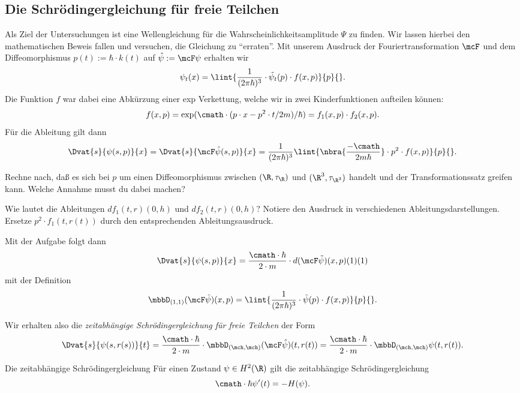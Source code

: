 \documentclass{subfiles}
\begin{document}
    \subsection{Die Schrödingergleichung für freie Teilchen}
    Als Ziel der Untersuchungen ist eine Wellengleichung für die Wahrscheinlichkeitsamplitude $\Psi$ zu finden. Wir lassen hierbei den mathematischen Beweis fallen und versuchen, die Gleichung zu \enquote{erraten}. Mit unserem Ausdruck der Fouriertransformation $\mcF$ und dem Diffeomorphismus $p(t) := \hbar\cdot k(t)$ auf $\hat\psi:=\mcF\psi$ erhalten wir
    \[
        \psi_t(x) = \lint{\frac{1}{(2\pi\hbar)^3}\cdot\tilde\psi_t(p)\cdot f(x,p)}{p}{}.
    \]
    Die Funktion $f$ war dabei eine Abkürzung einer exp Verkettung, welche wir in zwei Kinderfunktionen aufteilen können:
    \[f(x,p) = \exp(\cmath\cdot(p\cdot x - p^2\cdot t/2m)/\hbar) = f_1(x,p)\cdot f_2(x,p).\]
    Für die Ableitung gilt dann
    \[
        \Dvat{s}{\psi(s,p)}{x} = \Dvat{s}{\mcF\hat\psi(s,p)}{x} = \frac{1}{(2\pi\hbar)^3}\lint{\nbra{\frac{-\cmath}{2m\hbar}}\cdot p^2\cdot f(x,p)}{p}{}.
    \]
    \begin{Aufgabe}
        \nr{} Rechne nach, daß es sich bei $p$ um einen Diffeomorphismus zwischen $(\R,\tau_\R)$ und $(\R^3,\tau_{\R^3})$ handelt und der Transformationssatz greifen kann. Welche Annahme musst du dabei machen?

        \nr{} Wie lautet die Ableitungen $df_1(t,r)(0,h)$ und $df_2(t,r)(0,h)$? Notiere den Ausdruck in verschiedenen Ableitungsdarstellungen. Ersetze $p^2\cdot f_1(t,r(t))$ durch den entsprechenden Ableitungsausdruck. 
    \end{Aufgabe}
    \noindent Mit der Aufgabe folgt dann 
    \[\Dvat{s}{\psi(s,p)}{x} = \frac{\cmath\cdot\hbar}{2\cdot m}\cdot d(\mcF\tilde\psi)(x,p)(1)(1)\]
    mit der Definition 
    \[\mbbD_{(1,1)}(\mcF\hat\psi)(x,p) = \lint{\frac{1}{(2\pi\hbar)^3}\cdot\hat\psi(p)\cdot f(x,p)}{p}{}.\]
    \begin{whiteframedr}
        Wir erhalten also die \emph{zeitabhängige Schrödingergleichung für freie Teilchen} der Form
        \[\Dvat{s}{\psi(s,r(s))}{t} = \frac{\cmath\cdot\hbar}{2\cdot m}\cdot\mbbD_{(\mch,\mch)}(\mcF\hat\psi)(t,r(t)) = \frac{\cmath\cdot\hbar}{2\cdot m}\cdot\mbbD_{(\mch,\mch)}\psi(t,r(t)).\]
    \end{whiteframedr}
    \begin{mcor}{Die zeitabhängige Schrödingergleichung}
        Für einen Zustand $\psi\in H^2(\R)$ gilt die zeitabhängige Schrödingergleichung
        \[
            \cmath\cdot\hbar \psi'(t) = -H(\psi).
        \]
    \end{mcor}
\end{document}
